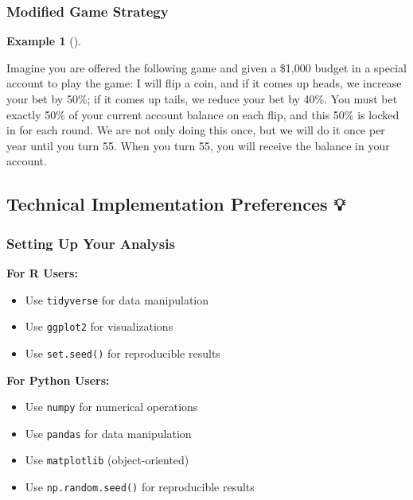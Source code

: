 \documentclass[
  letterpaper,
  DIV=11,
  numbers=noendperiod]{scrartcl}
\providecommand{\tightlist}{%
  \setlength{\itemsep}{0pt}\setlength{\parskip}{0pt}}
\theoremstyle{definition}
\newtheorem{example}{Example}[section]
\theoremstyle{remark}
\begin{document}
\subsubsection{Modified Game Strategy}\label{modified-game-strategy}

\begin{example}[]\protect\hypertarget{exm-ErgodicityEconomicsExampleModified}{}\label{exm-ErgodicityEconomicsExampleModified}

Imagine you are offered the following game and given a \$1,000 budget in
a special account to play the game: I will flip a coin, and if it comes
up heads, we increase your bet by 50\%; if it comes up tails, we reduce
your bet by 40\%. You must bet exactly 50\% of your current account
balance on each flip, and this 50\% is locked in for each round. We are
not only doing this once, but we will do it once per year until you turn
55. When you turn 55, you will receive the balance in your account.

\end{example}

\subsection{Technical Implementation Preferences
💡}\label{technical-implementation-preferences}

\subsubsection{Setting Up Your Analysis}\label{setting-up-your-analysis}

\textbf{For R Users:}

\begin{itemize}
\tightlist
\item
  Use \texttt{tidyverse} for data manipulation
\item
  Use \texttt{ggplot2} for visualizations
\item
  Use \texttt{set.seed()} for reproducible results
\end{itemize}

\textbf{For Python Users:}

\begin{itemize}
\tightlist
\item
  Use \texttt{numpy} for numerical operations
\item
  Use \texttt{pandas} for data manipulation
\item
  Use \texttt{matplotlib} (object-oriented)
\item
  Use \texttt{np.random.seed()} for reproducible results
\end{itemize}
\end{document}
